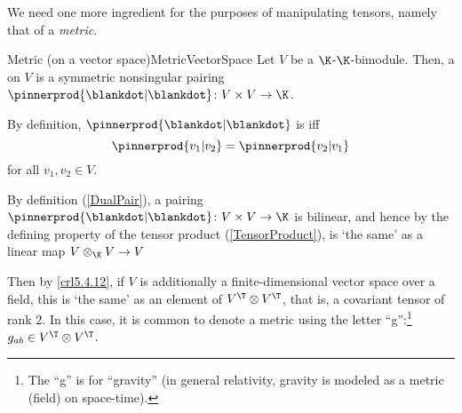 We need one more ingredient for the purposes of manipulating tensors, namely that of a \emph{metric}.
\begin{dfn}{Metric (on a vector space)}{MetricVectorSpace}
	Let $V$ be a $\K$-$\K$-bimodule.  Then, a  on $V$ is a symmetric nonsingular pairing $\pinnerprod{\blankdot |\blankdot}\colon V\times V\rightarrow \K$.
	\begin{rmk}
		By definition, $\pinnerprod{\blankdot |\blankdot}$ is  iff
		\begin{equation}
			\pinnerprod{v_1|v_2}=\pinnerprod{v_2|v_1}
		\end{equation}
		for all $v_1,v_2\in V$.
	\end{rmk}
	\begin{rmk}
		By definition (\cref{DualPair}), a pairing $\pinnerprod{\blankdot |\blankdot}\colon V\times V\rightarrow \K$ is bilinear, and hence by the defining property of the tensor product (\cref{TensorProduct}), is `the same' as a linear map $V\otimes _{\K}V\rightarrow V$
		
		Then by \cref{crl5.4.12}, if $V$ is additionally a finite-dimensional vector space over a field, this is `the same' as an element of $V^{\T}\otimes V^{\T}$, that is, a covariant tensor of rank $2$.  In this case, it is common to denote a metric using the letter ``g'':\footnote{The ``g'' is for ``gravity'' (in general relativity, gravity is modeled as a metric (field) on space-time).}  $g_{ab}\in V^{\T}\otimes V^{\T}$.
		

\end{rmk}
\end{dfn}
